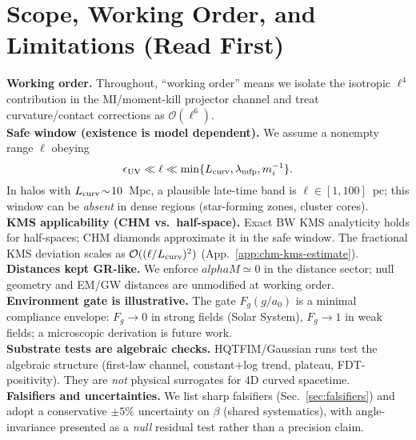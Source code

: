 \documentclass[aps,prd,onecolumn,superscriptaddress,nofootinbib]{revtex4-2}
\def\alphaM{alphaM}%
\def\alpha{alpha}%
\def\alpha_M{alphaM}%
\providecommand{\alphaM}{\alpha_M}
\begin{document}
\maketitle

\section{Scope, Working Order, and Limitations (Read First)}
\label{sec:scope}
\noindent\textbf{Working order.} Throughout, ``working order'' means we isolate the isotropic \(\ell^4\) contribution in the MI/moment-kill projector channel and treat curvature/contact corrections as \(\mathcal O(\ell^6)\).\\[3pt]
\noindent\textbf{Safe window (existence is model dependent).} We assume a nonempty range \(\ell\) obeying
\[
\epsilon_{\rm UV}\ll \ell \ll \min\{L_{\rm curv},\lambda_{\rm mfp},m_i^{-1}\}.
\]
In halos with \(L_{\rm curv}\!\sim\!10\)~Mpc, a plausible late-time band is \(\ell\in[1,100]\)~pc; this window can be \emph{absent} in dense regions (star-forming zones, cluster cores).\\[3pt]
\noindent\textbf{KMS applicability (CHM vs.\ half-space).} Exact BW KMS analyticity holds for half-spaces; CHM diamonds approximate it in the safe window. The fractional KMS deviation scales as \(\mathcal O((\ell/L_{\rm curv})^2)\) (App.~\ref{app:chm-kms-estimate}).\\[3pt]
\noindent\textbf{Distances kept GR-like.} We enforce \(\alphaM\simeq 0\) in the distance sector; null geometry and EM/GW distances are unmodified at working order.\\[3pt]
\noindent\textbf{Environment gate is illustrative.} The gate \(F_g(g/a_0)\) is a minimal compliance envelope: \(F_g\!\to\!0\) in strong fields (Solar System), \(F_g\!\to\!1\) in weak fields; a microscopic derivation is future work.\\[3pt]
\noindent\textbf{Substrate tests are algebraic checks.} HQTFIM/Gaussian runs test the algebraic structure (first-law channel, constant+log trend, plateau, FDT-positivity). They are \emph{not} physical surrogates for 4D curved spacetime.\\[3pt]
\noindent\textbf{Falsifiers and uncertainties.} We list sharp falsifiers (Sec.~\ref{sec:falsifiers}) and adopt a conservative \(\pm 5\%\) uncertainty on \(\beta\) (shared systematics), with angle-invariance presented as a \emph{null} residual test rather than a precision claim.

\end{document}
